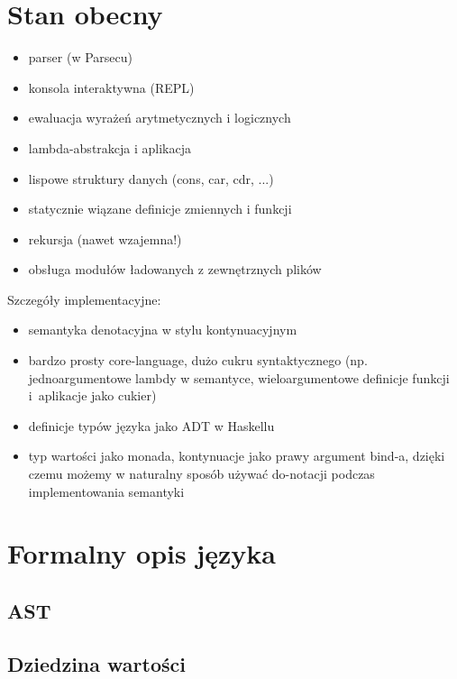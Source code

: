 \documentclass[12pt]{beamer}
\begin{document}
\section{Stan obecny}

\begin{frame}
\begin{itemize}
  \item parser (w Parsecu)
  \item konsola interaktywna (REPL)
  \item ewaluacja wyrażeń arytmetycznych i logicznych
  \item lambda-abstrakcja i aplikacja
  \item lispowe struktury danych (cons, car, cdr, ...)
  \item statycznie wiązane definicje zmiennych i funkcji
  \item rekursja (nawet wzajemna!)
  \item obsługa modułów ładowanych z zewnętrznych plików
\end{itemize}
\end{frame}


\begin{frame}
Szczegóły implementacyjne:
\begin{itemize}
  \item semantyka denotacyjna w stylu kontynuacyjnym
  \item bardzo prosty core-language, dużo cukru syntaktycznego
        (np. jednoargumentowe lambdy w semantyce,
        wieloargumentowe definicje funkcji i~aplikacje jako cukier)
  \item definicje typów języka jako ADT w Haskellu
  \item typ wartości jako monada, kontynuacje jako prawy argument bind-a,
        dzięki czemu możemy w naturalny sposób używać do-notacji podczas
        implementowania semantyki
\end{itemize}
\end{frame}

\section{Formalny opis języka}

\subsection{AST}

\subsection{Dziedzina wartości}
\end{document}
